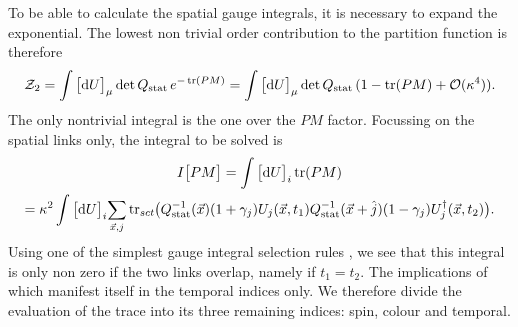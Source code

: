 To be able to calculate the spatial gauge integrals, it is necessary to expand
the exponential. The lowest non trivial order contribution to the partition
function is therefore
%
\begin{equation} \label{eq:single_hop_partition}
  \mathcal{Z}_2 = \int \big[ \mathrm{d} U \big]_{\mu} \det Q_{\text{stat}} \, e^{-\operatorname{tr}(PM)}
    = \int \big[ \mathrm{d} U \big]_{\mu} \det Q_{\text{stat}} \, (1 - \operatorname{tr}(PM) + \mathcal{O}(\kappa^4)).
\end{equation}
%
The only nontrivial integral is the one over the $PM$ factor. Focussing on the
spatial links only, the integral to be solved is
%
\begin{multline}
  I\big[PM\big] = \int \big[ \mathrm{d} U \big]_i \tr(PM) \\
   = \kappa^2 \int \big[ \mathrm{d} U \big]_i \scalemath{0.95}{\sum_{\vec{x}, j}} \tr_{sct} \hskip-.5ex
   \big( \qstat^{-1}(\vec{x})(1+\gamma_j) U_j(\vec{x},t_1) 
   \qstat^{-1}(\vec{x}+\hat{j})(1-\gamma_j)U^{\dagger}_j(\vec{x},t_2) \big).
   \label{eq-second-order-spatial-integral}
\end{multline}
%
Using one of the simplest gauge integral selection rules
, we see that this integral is only non zero
if the two links overlap, namely if $t_1 = t_2$. The implications of which
manifest itself in the temporal indices only. We therefore divide the evaluation
of the trace into its three remaining indices: spin, colour and temporal.


